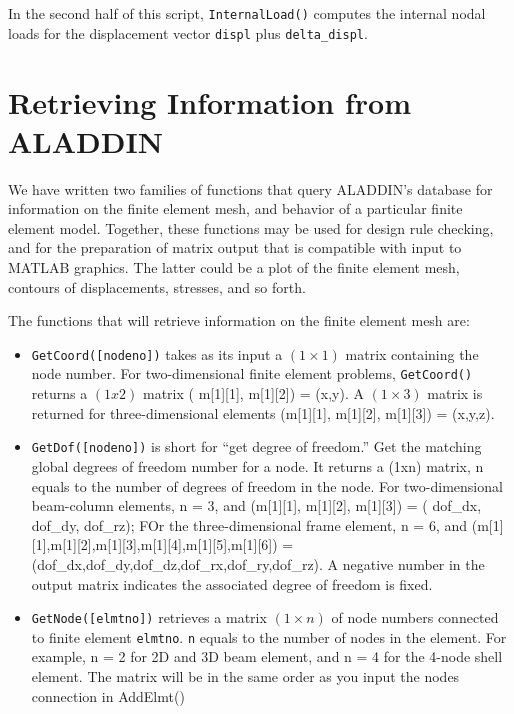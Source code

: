 \vspace{0.15 in}\noindent
In the second half of this script, {\tt InternalLoad()} computes
the internal nodal loads for the displacement
vector {\tt displ} plus {\tt delta\_displ}. 

\section{Retrieving Information from ALADDIN}

\vspace{0.15 in}
\noindent\hspace{0.50 in}
We have written two families of functions that query ALADDIN's
database for information on the finite element mesh,
and behavior of a particular finite element model.
Together, these functions may be used for design rule checking,
and for the preparation of matrix output that is compatible
with input to MATLAB graphics. The latter could be a plot
of the finite element mesh, contours of displacements, stresses, and so forth.

\vspace{0.15 in}\noindent
The functions that will retrieve information on the finite element mesh are:

\begin{itemize}
\item{}
{\tt GetCoord([nodeno])} takes as its input a $(1\times1)$ matrix
containing the node number.
For two-dimensional finite element problems, {\tt GetCoord()} 
returns a $(1x2)$ matrix ( m[1][1], m[1][2]) = (x,y).
A $(1\times3)$ matrix is returned for three-dimensional
elements (m[1][1], m[1][2], m[1][3]) = (x,y,z).

\item{}
{\tt GetDof([nodeno])} is short for ``get degree of freedom.''
Get the matching global degrees of freedom number for a node.
It returns a (1xn) matrix, n equals to the number of degrees of freedom in the node.
For two-dimensional beam-column elements, n = 3,
and (m[1][1], m[1][2], m[1][3]) = ( dof\_dx, dof\_dy, dof\_rz);
FOr the three-dimensional frame element,
n = 6,  and (m[1][1],m[1][2],m[1][3],m[1][4],m[1][5],m[1][6]) =
(dof\_dx,dof\_dy,dof\_dz,dof\_rx,dof\_ry,dof\_rz).
A negative number in the output matrix indicates the associated degree of freedom is fixed.

\item{}
{\tt GetNode([elmtno])} retrieves a matrix $(1 \times n)$ of node numbers connected to 
finite element {\tt elmtno}. {\tt n} equals to the number of nodes in the element.
For example, n = 2 for 2D and 3D beam element,
and n = 4 for the 4-node shell element.
The matrix will be in the same order as you input the nodes connection in AddElmt()
\end{itemize}

